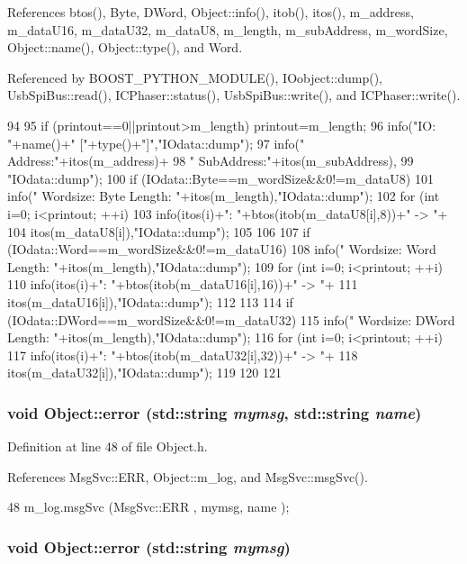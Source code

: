 References btos(), Byte, DWord, Object::info(), itob(), itos(), m\_\-address, m\_\-dataU16, m\_\-dataU32, m\_\-dataU8, m\_\-length, m\_\-subAddress, m\_\-wordSize, Object::name(), Object::type(), and Word.

Referenced by BOOST\_\-PYTHON\_\-MODULE(), IOobject::dump(), UsbSpiBus::read(), ICPhaser::status(), UsbSpiBus::write(), and ICPhaser::write().


\begin{DoxyCode}
94                                       {
95   if (printout==0||printout>m_length) printout=m_length;
96   info("IO: "+name()+" ["+type()+"]","IOdata::dump");
97   info(" Address:"+itos(m_address)+
98        " SubAddress:"+itos(m_subAddress),
99        "IOdata::dump");
100   if (IOdata::Byte==m_wordSize&&0!=m_dataU8){
101     info(" Wordsize: Byte  Length: "+itos(m_length),"IOdata::dump");
102     for (int i=0; i<printout; ++i){
103       info(itos(i)+": "+btos(itob(m_dataU8[i],8))+" -> "+
104           itos(m_dataU8[i]),"IOdata::dump");
105     }
106   }
107   if (IOdata::Word==m_wordSize&&0!=m_dataU16){
108     info(" Wordsize: Word  Length: "+itos(m_length),"IOdata::dump");
109     for (int i=0; i<printout; ++i){
110       info(itos(i)+": "+btos(itob(m_dataU16[i],16))+" -> "+
111           itos(m_dataU16[i]),"IOdata::dump");
112     }
113   }
114   if (IOdata::DWord==m_wordSize&&0!=m_dataU32){
115     info(" Wordsize: DWord Length: "+itos(m_length),"IOdata::dump");
116     for (int i=0; i<printout; ++i){
117       info(itos(i)+": "+btos(itob(m_dataU32[i],32))+" -> "+
118           itos(m_dataU32[i]),"IOdata::dump");
119     }
120   }
121 }
\end{DoxyCode}
\hypertarget{classObject_ad7f6c457733082efa2f9ff5f5c8e119a}{
\subsubsection[{error}]{\setlength{\rightskip}{0pt plus 5cm}void Object::error (std::string {\em mymsg}, \/  std::string {\em name})}}
\label{classObject_ad7f6c457733082efa2f9ff5f5c8e119a}


Definition at line 48 of file Object.h.

References MsgSvc::ERR, Object::m\_\-log, and MsgSvc::msgSvc().


\begin{DoxyCode}
48 { m_log.msgSvc (MsgSvc::ERR     , mymsg, name ); }
\end{DoxyCode}
\hypertarget{classObject_a204a95f57818c0f811933917a30eff45}{
\subsubsection[{error}]{\setlength{\rightskip}{0pt plus 5cm}void Object::error (std::string {\em mymsg})}}
\label{classObject_a204a95f57818c0f811933917a30eff45}


